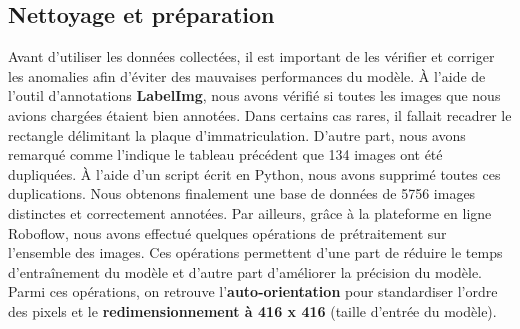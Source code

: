     \subsection{Nettoyage et préparation}
    Avant d’utiliser les données collectées, il est important de les vérifier et corriger les anomalies afin d’éviter des mauvaises performances du modèle. À l’aide de l’outil d’annotations \textbf{LabelImg}, nous avons vérifié si toutes les images que nous avions chargées étaient bien annotées. Dans certains cas rares, il fallait recadrer le rectangle délimitant la plaque d’immatriculation. D’autre part, nous avons remarqué comme l’indique le tableau précédent que 134 images ont été dupliquées. À l’aide d’un script écrit en Python, nous avons supprimé toutes ces duplications. Nous obtenons finalement une base de données de 5756 images distinctes et correctement annotées. Par ailleurs, grâce à la plateforme en ligne Roboflow, nous avons effectué quelques opérations de prétraitement sur l’ensemble des images. Ces opérations permettent d’une part de réduire le temps d’entraînement du modèle et d’autre part d'améliorer la précision du modèle. Parmi ces opérations, on retrouve l’\textbf{auto-orientation} pour standardiser l’ordre des pixels et le \textbf{redimensionnement à 416 x 416} (taille d’entrée du modèle).

